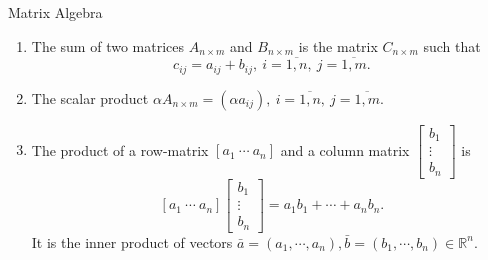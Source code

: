 \documentclass[11pt,aspectratio=169]{beamer}
\begin{document}
    \begin{frame}[t]{Matrix Algebra}
        \begin{enumerate}
            \item The sum of two matrices $A_{n\times m}$ and $B_{n \times m}$ is the matrix $C_{n \times m}$ such that 
            \begin{equation*}
                c_{ij} = a_{ij} + b_{ij}, \ i = \overline{1,n}, \ j = \overline{1,m}.
            \end{equation*}
            
            \item The scalar product $\alpha A_{n \times m}= (\alpha a_{ij}), \ i = \overline{1,n}, \ j = \overline{1,m}$. 
            
            \item The product of a row-matrix $\left[a_1 \ \cdots \ a_n \right]$ and a column matrix $\left[ \begin{array}{c} b_1 \\ \vdots \\ b_n \end{array}\right]$ is 
            \begin{equation*}
                \left[a_1 \ \cdots \ a_n \right] \left[ \begin{array}{c} b_1 \\ \vdots \\ b_n \end{array}\right] = a_1b_1 + \cdots + a_n b_n.
            \end{equation*}
            It is the \textcolor{yy}{inner product} of vectors $\bar{a} = (a_1,\cdots,a_n), \bar{b} = (b_1,\cdots,b_n) \in \mathbb{R}^n$. 
        \end{enumerate}
    \end{frame}
\end{document}
